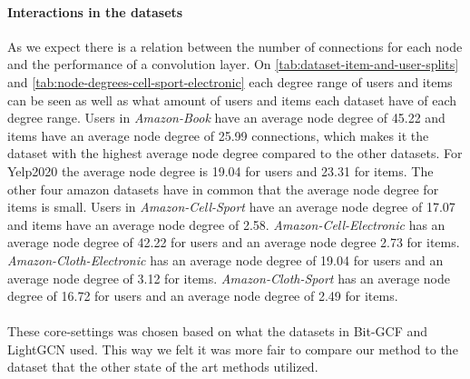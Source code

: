 \paragraph{Interactions in the datasets}
As we expect there is a relation between the number of connections for each node and the performance of a convolution layer.
On \autoref{tab:dataset-item-and-user-splits} and \autoref{tab:node-degrees-cell-sport-electronic} each degree range of users and items can be seen as well as what amount of users and items each dataset have of each degree range.
Users in \textit{Amazon-Book} have an average node degree of 45.22 and items have an average node degree of 25.99 connections, which makes it the dataset with the highest average node degree compared to the other datasets.
For Yelp2020 the average node degree is 19.04 for users and 23.31 for items.
The other four amazon datasets have in common that the average node degree for items is small.
Users in \textit{Amazon-Cell-Sport} have an average node degree of 17.07 and items have an average node degree of 2.58.
\textit{Amazon-Cell-Electronic} has an average node degree of 42.22 for users and an average node degree 2.73 for items.
\textit{Amazon-Cloth-Electronic} has an average node degree of 19.04 for users and an average node degree of 3.12 for items.
\textit{Amazon-Cloth-Sport} has an average node degree of 16.72 for users and an average node degree of 2.49 for items.
\\
\\
These core-settings was chosen based on what the datasets in Bit-GCF and LightGCN used. 
This way we felt it was more fair to compare our method to the dataset that the other state of the art methods utilized.


